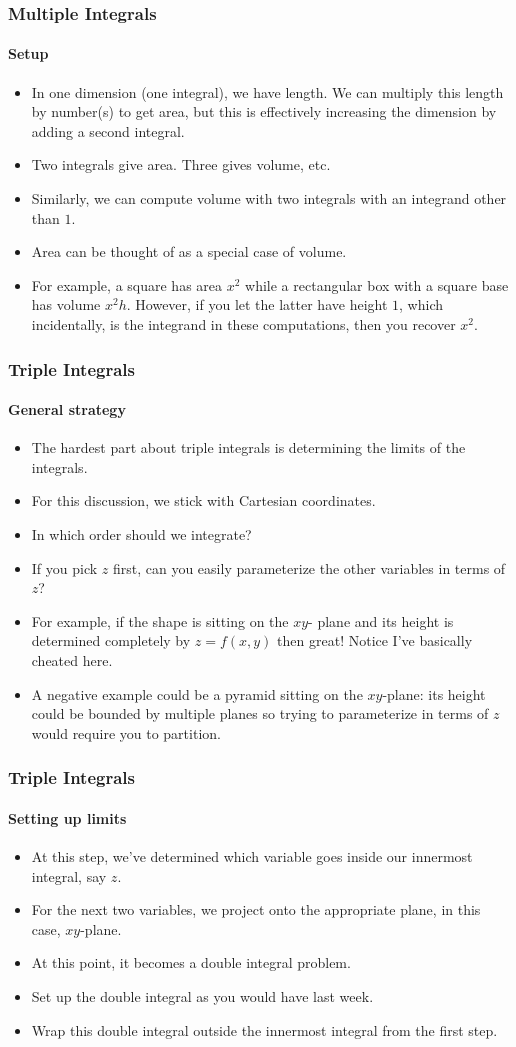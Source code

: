 \documentclass[xcolor=svgnames]{beamer}
\begin{document}
\begin{frame}
\frametitle{Multiple Integrals}
\framesubtitle{Setup}
\begin{itemize}
\item In one dimension (one integral), we have length. We can multiply this length by number(s) to get area, but this is effectively increasing the dimension by adding a second integral. 
\item Two integrals give area. Three gives volume, etc. 
\item Similarly, we can compute volume with two integrals with an integrand other than $1$. 
\item Area can be thought of as a special case of volume. 
\item For example, a square has area $x^2$ while a rectangular box with a square base has volume $x^2 h$. However, if you let the latter have height $1$, which incidentally, is the integrand in these computations, then you recover $x^2$. 
\end{itemize}
\end{frame}
\begin{frame}
\frametitle{Triple Integrals}
\framesubtitle{General strategy}
\begin{itemize}
\item The hardest part about triple integrals is determining the limits of the integrals. 
\item For this discussion, we stick with Cartesian coordinates. 
\item In which order should we integrate?
\item If you pick $z$ first, can you easily parameterize the other variables in terms of $z$? 
\item For example, if the shape is sitting on the $xy$- plane and its height is determined completely by $z = f(x,y)$ then great! Notice I've basically cheated here. 
\item A negative example could be a pyramid sitting on the $xy$-plane: its height could be bounded by multiple planes so trying to parameterize in terms of $z$ would require you to partition. 
\end{itemize}
\end{frame}
\begin{frame}
\frametitle{Triple Integrals}
\framesubtitle{Setting up limits}
\begin{itemize}
\item At this step, we've determined which variable goes inside our innermost integral, say $z$. 
\item For the next two variables, we project onto the appropriate plane, in this case, $xy$-plane. 
\item At this point, it becomes a double integral problem. 
\item Set up the double integral as you would have last week. 
\item Wrap this double integral outside the innermost integral from the first step. 

\end{itemize}
\end{frame}
\end{document}
